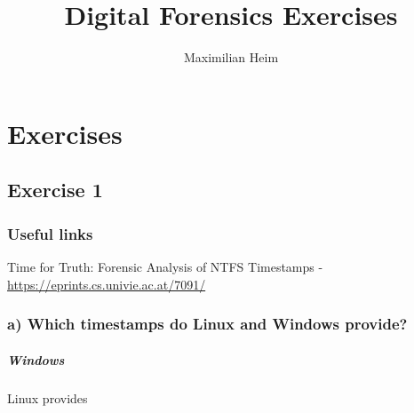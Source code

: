 \documentclass[10pt,a4paper]{report}
\author{Maximilian Heim}
\title{Digital Forensics Exercises}
\begin{document}
\chapter{Exercises}
\section{Exercise 1}
\subsection{Useful links}
Time for Truth: Forensic Analysis of NTFS Timestamps - \url{https://eprints.cs.univie.ac.at/7091/}
\subsection{a) Which timestamps do Linux and Windows provide?}
\paragraph{Windows}
Linux provides \cite{cs7091} 




\end{document}
